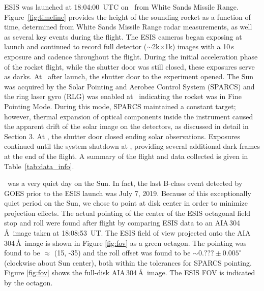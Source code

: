 
		ESIS was launched at 18:04:00~UTC %
		on \dateMission\ from White Sands Missile Range.  Figure~\ref{fig:timeline} provides the height of the sounding rocket as a function of time, determined from White Sands Missile Range radar measurements, as well as several key events during the flight.  The ESIS cameras began exposing at launch and continued to record full detector ($\sim$2k$\times$1k) images with a 10\,s exposure and cadence throughout the flight. During the initial acceleration phase of the rocket flight, while the shutter door was still closed, these exposures serve as darks.  At \timeMissionShutterOpen\ after launch, the shutter door to the experiment opened.  The Sun was acquired by the Solar Pointing and Aerobee Control System (SPARCS) and the ring laser gyro (RLG) was enabled at \timeMissionRlgEnable\ indicating the rocket was in Fine Pointing Mode.  During this mode, SPARCS maintained a constant target; however, thermal expansion of optical components inside the instrument caused the apparent drift of the solar image on the detectors, as discussed in detail in Section 3.  At  \timeMissionShutterClose, the shutter door closed ending solar observations.  Exposures continued until the system shutdown at \timeDataStop, providing several additional dark frames at the end of the flight.   A summary of the flight and data collected is given in Table~\ref{tab:data_info}.
		
	    \dateMission\ was a very quiet day on the Sun.  In fact, the last  B-class event detected by GOES \citep{GOES} prior to the ESIS launch was July 7, 2019.  Because of this exceptionally quiet period on the Sun, we chose to point at disk center in order to minimize projection effects.   The actual pointing of the center of the ESIS octagonal field stop and roll were found after flight by comparing ESIS  data to an AIA\,304\,\AA\ image taken at 18:08:53~UT.  The ESIS field of view projected onto the AIA 304\,\AA\ image is shown in Figure \ref{fig:fov} as a green octagon.  The pointing was found to be $\approx$ (15\arcsec, -35\arcsec) and the roll offset was found to be $\sim0.???\pm 0.005^\circ$ (clockwise about Sun center), both within the tolerances for SPARCS pointing.  Figure \ref{fig:fov} shows the full-disk AIA\,304\,\AA\ image. The ESIS FOV is indicated by the octagon.  
		
